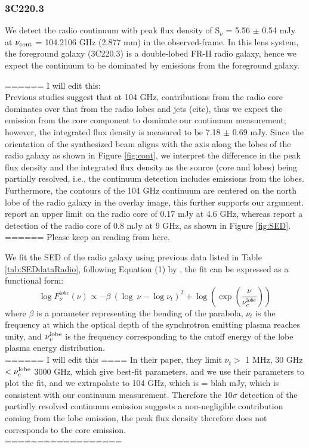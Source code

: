 \documentclass{emulateapj}
\begin{document}
\subsubsection{3C220.3}

We detect the radio continuum with peak flux density of S$_\nu$ = 5.56 $\pm$ 0.54 mJy at $\nu_{\rm cont}$ = 104.2106 GHz 
(2.877 mm) in the observed-frame. In this lens system, the foreground galaxy (3C220.3) is a double-lobed FR-II radio galaxy, 
hence we expect the continuum to be dominated by emissions from the foreground galaxy. 

====== I will edit this: \\
Previous studies suggest that at 104 GHz, contributions from the radio core dominates over that from the radio lobes and jets (cite), thus we 
expect the emission from the core component to dominate our continuum measurement; however, the integrated flux density is measured 
to be 7.18 $\pm$ 0.69 mJy. Since the orientation of the synthesized beam aligns with the axis along the 
lobes of the radio galaxy as shown in Figure \ref{fig:cont}, we interpret the difference in the peak flux 
density and the integrated flux density as the source (core and lobes) being partially resolved, i.e., the continuum detection 
includes emissions from the lobes. Furthermore, the contours of the 104 GHz continuum are
centered on the north lobe of the radio galaxy in the overlay image, this further supports our argument. 
\citet{Mullin06a} report an upper limit on the radio core of 0.17 mJy at 4.6 GHz, whereas \citet{Haas14} 
report a detection of the radio core of 0.8 mJy at 9 GHz, as shown in Figure \ref{fig:SED}.\\
====== Please keep on reading from here.

We fit the SED of the radio galaxy using previous data listed in Table \ref{tab:SEDdataRadio}, following Equation (1) by \citet{Cleary07a}, the fit can be expressed as a functional form:
\begin{equation}
\log F_{\nu}^{\mathrm lobe} (\nu) \propto - \beta\ (\log\ \nu - \log \nu_{t})^2  + \log (\exp({\frac{\nu}{\nu_c^{\mathrm lobe}}}))
\end{equation}
where $\beta$ is a parameter representing the bending of the parabola, $\nu_t$ is the frequency at which the optical depth of the synchrotron emitting plasma reaches unity, and $\nu_v^{\rm lobe}$ is the frequency corresponding to the cutoff energy of the lobe plasma energy distribution. 
\\ ====== I will edit this ====
In their paper, they limit $\nu_t >$ 1 MHz, 30 GHz $< \nu_c^{\rm lobe}$ 3000 GHz, which give best-fit parameters, and we use their parameters to plot the fit, and we extrapolate to 104 GHz, which is = blah mJy, which is consistent with our continuum measurement. Therefore the 10$\sigma$ detection of the partially resolved continuum emission suggests a 
non-negligible contribution coming from the lobe emission, the peak flux density therefore does not corresponds to the core 
emission. 
\\ ==================

\end{document}
